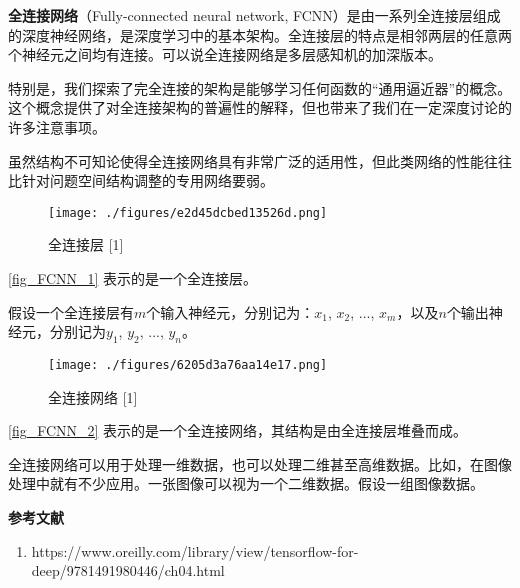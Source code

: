 



\textbf{全连接网络}（Fully-connected neural network, FCNN）是由一系列全连接层组成的深度神经网络，是深度学习中的基本架构。全连接层的特点是相邻两层的任意两个神经元之间均有连接。可以说全连接网络是多层感知机的加深版本。

特别是，我们探索了完全连接的架构是能够学习任何函数的“通用逼近器”的概念。这个概念提供了对全连接架构的普遍性的解释，但也带来了我们在一定深度讨论的许多注意事项。

虽然结构不可知论使得全连接网络具有非常广泛的适用性，但此类网络的性能往往比针对问题空间结构调整的专用网络要弱。

\begin{figure}[ht]
\centering
\texttt{[image: ./figures/e2d45dcbed13526d.png]}
\caption{全连接层 [1]} \label{fig_FCNN_1}
\end{figure}
\autoref{fig_FCNN_1} 表示的是一个全连接层。

假设一个全连接层有$m$个输入神经元，分别记为：$x_1$, $x_2$, ..., $x_m$，以及$n$个输出神经元，分别记为$y_1$, $y_2$, ..., $y_n$。

\begin{figure}[ht]
\centering
\texttt{[image: ./figures/6205d3a76aa14e17.png]}
\caption{全连接网络 [1]} \label{fig_FCNN_2}
\end{figure}
\autoref{fig_FCNN_2} 表示的是一个全连接网络，其结构是由全连接层堆叠而成。

全连接网络可以用于处理一维数据，也可以处理二维甚至高维数据。比如，在图像处理中就有不少应用。一张图像可以视为一个二维数据。假设一组图像数据。



\textbf{参考文献}
\begin{enumerate}
\item https://www.oreilly.com/library/view/tensorflow-for-deep/9781491980446/ch04.html
\end{enumerate}